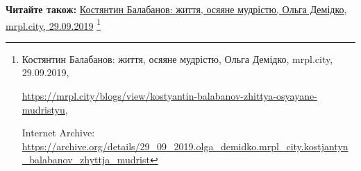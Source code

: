  
 
 
 
 

\def\pubIA{https://archive.org/details/29_09_2019.olga_demidko.mrpl_city.kostjantyn_balabanov_zhyttja_mudrist}
\def\pubTitle{Костянтин Балабанов: життя, осяяне мудрістю}
\def\pubDate{29.09.2019}
\def\pubOrigin{https://mrpl.city/blogs/view/kostyantin-balabanov-zhittya-osyayane-mudristyu}
\def\pubAuthor{Ольга Демідко}

\textbf{Читайте також:} \href{\pubIA}{%
\pubTitle, \pubAuthor, mrpl.city, \pubDate}%
\footnote{\pubTitle, \pubAuthor, mrpl.city, \pubDate, \par\url{\pubOrigin}, \par Internet Archive: \url{\pubIA}}
